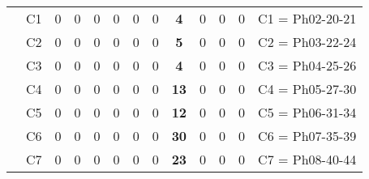 \begin{table}[H]
{\begin{tabular}{|ccrrrrrrrrrrc|}
\multicolumn{1}{|c|}{}                                      & \multicolumn{1}{c|}{C1} & \multicolumn{1}{c|}{0}  & \multicolumn{1}{c|}{0}  & \multicolumn{1}{c|}{0}  & \multicolumn{1}{c|}{0}  & \multicolumn{1}{c|}{0}  & \multicolumn{1}{c|}{0}  & \multicolumn{1}{c|}{\textbf{4}}  & \multicolumn{1}{c|}{0}  & \multicolumn{1}{c|}{0}  & \multicolumn{1}{c|}{0}  & C1 = Ph02-20-21   \\ \cline{2-13}
\multicolumn{1}{|c|}{}                                      & \multicolumn{1}{c|}{C2} & \multicolumn{1}{c|}{0}  & \multicolumn{1}{c|}{0}  & \multicolumn{1}{c|}{0}  & \multicolumn{1}{c|}{0}  & \multicolumn{1}{c|}{0}  & \multicolumn{1}{c|}{0}  & \multicolumn{1}{c|}{\textbf{5}}  & \multicolumn{1}{c|}{0}  & \multicolumn{1}{c|}{0}  & \multicolumn{1}{c|}{0}  & C2 = Ph03-22-24   \\ \cline{2-13}
\multicolumn{1}{|c|}{}                                      & \multicolumn{1}{c|}{C3} & \multicolumn{1}{c|}{0}  & \multicolumn{1}{c|}{0}  & \multicolumn{1}{c|}{0}  & \multicolumn{1}{c|}{0}  & \multicolumn{1}{c|}{0}  & \multicolumn{1}{c|}{0}  & \multicolumn{1}{c|}{\textbf{4}}  & \multicolumn{1}{c|}{0}  & \multicolumn{1}{c|}{0}  & \multicolumn{1}{c|}{0}  & C3 = Ph04-25-26   \\ \cline{2-13}
\multicolumn{1}{|c|}{}                                      & \multicolumn{1}{c|}{C4} & \multicolumn{1}{c|}{0}  & \multicolumn{1}{c|}{0}  & \multicolumn{1}{c|}{0}  & \multicolumn{1}{c|}{0}  & \multicolumn{1}{c|}{0}  & \multicolumn{1}{c|}{0}  & \multicolumn{1}{c|}{\textbf{13}} & \multicolumn{1}{c|}{0}  & \multicolumn{1}{c|}{0}  & \multicolumn{1}{c|}{0}  & C4 = Ph05-27-30   \\ \cline{2-13}
\multicolumn{1}{|c|}{}                                      & \multicolumn{1}{c|}{C5} & \multicolumn{1}{c|}{0}  & \multicolumn{1}{c|}{0}  & \multicolumn{1}{c|}{0}  & \multicolumn{1}{c|}{0}  & \multicolumn{1}{c|}{0}  & \multicolumn{1}{c|}{0}  & \multicolumn{1}{c|}{\textbf{12}} & \multicolumn{1}{c|}{0}  & \multicolumn{1}{c|}{0}  & \multicolumn{1}{c|}{0}  & C5 = Ph06-31-34   \\ \cline{2-13}
\multicolumn{1}{|c|}{}                                      & \multicolumn{1}{c|}{C6} & \multicolumn{1}{c|}{0}  & \multicolumn{1}{c|}{0}  & \multicolumn{1}{c|}{0}  & \multicolumn{1}{c|}{0}  & \multicolumn{1}{c|}{0}  & \multicolumn{1}{c|}{0}  & \multicolumn{1}{c|}{\textbf{30}} & \multicolumn{1}{c|}{0}  & \multicolumn{1}{c|}{0}  & \multicolumn{1}{c|}{0}  & C6 = Ph07-35-39   \\ \cline{2-13}
\multicolumn{1}{|c|}{}                                      & \multicolumn{1}{c|}{C7} & \multicolumn{1}{c|}{0}  & \multicolumn{1}{c|}{0}  & \multicolumn{1}{c|}{0}  & \multicolumn{1}{c|}{0}  & \multicolumn{1}{c|}{0}  & \multicolumn{1}{c|}{0}  & \multicolumn{1}{c|}{\textbf{23}} & \multicolumn{1}{c|}{0}  & \multicolumn{1}{c|}{0}  & \multicolumn{1}{c|}{0}  & C7 = Ph08-40-44   \\ \cline{2-13}

\end{tabular}}
\end{table}
